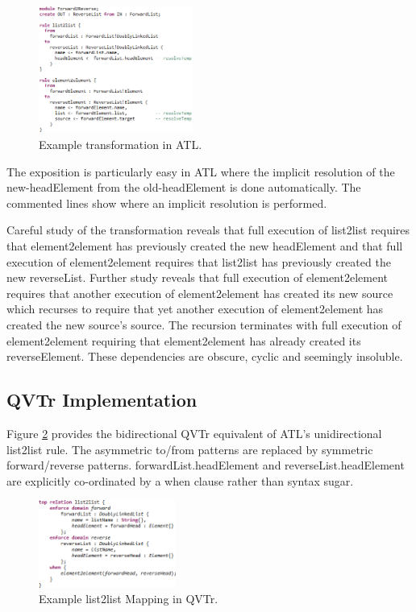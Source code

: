 \documentclass[conference]{IEEEtran}
\begin{document}
\begin{figure}[h]
	\centering
	\includegraphics[width=0.45\textwidth]{Forward2Reverse-ATL.png}
	\caption{Example transformation in ATL.}
	\label{fig:Forward2Reverse-ATL}
\end{figure}

The exposition is particularly easy in ATL where the implicit resolution of the new-headElement from the old-headElement is done automatically. The commented lines show where an implicit resolution is performed.

Careful study of the transformation reveals that full execution of list2list requires that element2element has previously created the new headElement and that full execution of element2element requires that list2list has previously created the new reverseList. Further study reveals that full execution of element2element requires that another execution of element2element has created its new source which recurses to require that yet another execution of element2element has created the new source's source. The recursion terminates with full execution of element2element requiring that element2element has already created its reverseElement. These dependencies are obscure, cyclic and seemingly insoluble.

\subsection{QVTr Implementation}

Figure \ref{fig:List2List-QVTr} provides the bidirectional QVTr equivalent of ATL's unidirectional list2list rule. The asymmetric to/from patterns are replaced by symmetric forward/reverse patterns. forwardList.headElement and reverseList.headElement are explicitly co-ordinated by a when clause rather than syntax sugar.

\begin{figure}[h]
	\centering
	\includegraphics[width=0.4\textwidth]{List2List-QVTr.png}
	\caption{Example list2list Mapping in QVTr.}
	\label{fig:List2List-QVTr}
\end{figure}
\end{document}
